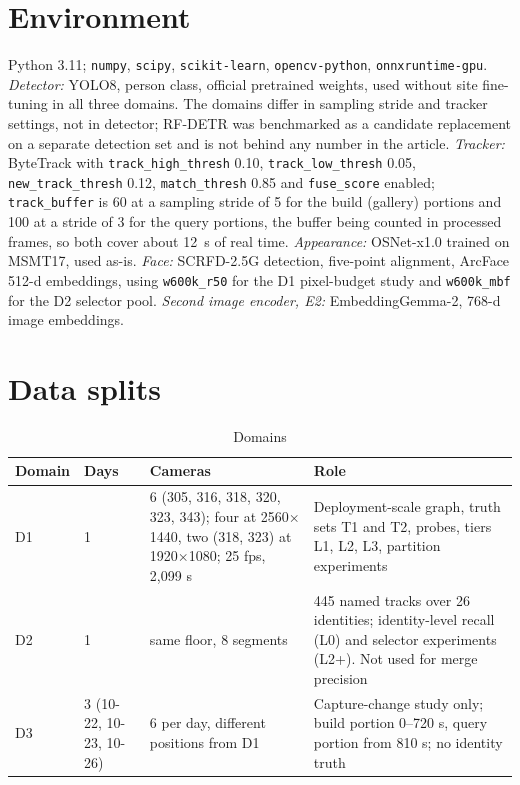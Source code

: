 \documentclass[10pt,a4paper]{article}
\begin{document}
\section{Environment}
Python 3.11; \texttt{numpy}, \texttt{scipy}, \texttt{scikit-learn}, \texttt{opencv-python}, \texttt{onnxruntime-gpu}. \emph{Detector:} YOLO8, person class, official pretrained weights, used without site fine-tuning in all three domains. The domains differ in sampling stride and tracker settings, not in detector; RF-DETR was benchmarked as a candidate replacement on a separate detection set and is not behind any number in the article. \emph{Tracker:} ByteTrack with \texttt{track\_high\_thresh} 0.10, \texttt{track\_low\_thresh} 0.05, \texttt{new\_track\_thresh} 0.12, \texttt{match\_thresh} 0.85 and \texttt{fuse\_score} enabled; \texttt{track\_buffer} is 60 at a sampling stride of 5 for the build (gallery) portions and 100 at a stride of 3 for the query portions, the buffer being counted in processed frames, so both cover about 12~s of real time. \emph{Appearance:} OSNet-x1.0 trained on MSMT17, used as-is. \emph{Face:} SCRFD-2.5G detection, five-point alignment, ArcFace 512-d embeddings, using \texttt{w600k\_r50} for the D1 pixel-budget study and \texttt{w600k\_mbf} for the D2 selector pool. \emph{Second image encoder, E2:} EmbeddingGemma-2, 768-d image embeddings.

\section{Data splits}
\begin{table}[h]\centering
\caption{Domains}
\begin{tabular}{@{}llp{3.2cm}p{6.2cm}@{}}
\toprule
Domain & Days & Cameras & Role\\
\midrule
D1 & 1 & 6 (305, 316, 318, 320, 323, 343); four at 2560$\times$1440, two (318, 323) at 1920$\times$1080; 25 fps, 2,099 s & Deployment-scale graph, truth sets T1 and T2, probes, tiers L1, L2, L3, partition experiments\\
D2 & 1 & same floor, 8 segments & 445 named tracks over 26 identities; identity-level recall (L0) and selector experiments (L2+). Not used for merge precision\\
D3 & 3 (10-22, 10-23, 10-26) & 6 per day, different positions from D1 & Capture-change study only; build portion 0--720 s, query portion from 810 s; no identity truth\\
\bottomrule
\end{tabular}
\end{table}
\end{document}
